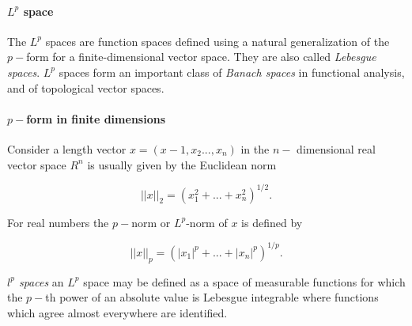 
\paragraph{$L^p$ space}


The $L^p$ spaces are function spaces defined using a natural generalization of the $p-$form for a finite-dimensional vector space. 
They are also called \textit{Lebesgue spaces}. 
$L^p$ spaces form an important class of \textit{Banach spaces} in functional analysis, and of topological vector spaces.


\paragraph{$p-$form in finite dimensions}


Consider a length vector $x=(x-1, x_2...,x_n)$ in the $n-$ dimensional real vector space $R^n$ is usually given by the Euclidean norm 

\begin{equation}
||x||_2 = (x_1 ^2 + ... + x_n ^2)^{1/2}.
\end{equation}

For real numbers the $p-$norm or $L^p$-norm of $x$ is defined by

\begin{equation}
||x||_p = (|x_1|^p + ... + |x_n|^p)^{1/p}.
\end{equation}

\textit{$l^p$ spaces}
an $L^p$ space may be defined as a space of measurable functions for which the $p-$th power of an absolute value is Lebesgue integrable where functions which agree almost everywhere are identified.


